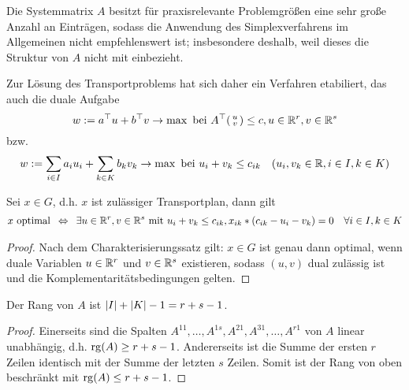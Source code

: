 Die Systemmatrix $A$ besitzt für praxisrelevante Problemgrößen eine sehr große Anzahl an Einträgen, sodass die Anwendung des Simplexverfahrens im Allgemeinen nicht empfehlenswert ist; insbesondere deshalb, weil dieses die Struktur von $A$ nicht mit einbezieht.

Zur Lösung des Transportproblems hat sich daher ein Verfahren etabiliert, das auch die duale Aufgabe 
\begin{equation}
	w \mathrel{:=} a^{\top} u + b^{\top} v \to \max \text{ bei } A^{\top} \begin{psmallmatrix} u \\ v \end{psmallmatrix} \le c, u \in \mathbb{R}^r, v \in \mathbb{R}^s
	\label{eq: 3.16}
\end{equation}
bzw.
\begin{equation}
	w \mathrel{:=} \sum_{i \in I} a_i u_i + \sum_{k \in K} b_k v_k \to \max \text{ bei } u_i + v_k \le c_{ik} \quad (u_i, v_k \in \mathbb{R}, i \in I, k \in K)
	\label{eq: 3.17}
\end{equation}

\begin{satz}[Optimalitätskriterium] %
	\label{satz: 3.14}
	Sei $x \in G$, d.h. $x$ ist zulässiger Transportplan, dann gilt
	\begin{equation*}
		\begin{aligned}
			x \text{ optimal} \enskip \Leftrightarrow \enskip \exists u \in \mathbb{R}^r, v \in \mathbb{R}^s \text{ mit } u_i + v_k \le c_{ik}, x_{ik} * (c_{ik} - u_i - v_k) = 0 \quad \forall i \in I, k \in K
		\end{aligned}
	\end{equation*}
\end{satz}
\begin{proof}
	Nach dem Charakterisierungssatz gilt: $x \in G$ ist genau dann optimal, wenn duale Variablen $u \in \mathbb{R}^r$ und $v \in \mathbb{R}^s$ existieren, sodass $(u,v)$ dual zulässig ist und die Komplementaritätsbedingungen gelten.
\end{proof}

\begin{aussage} %
	Der Rang von $A$ ist $\left| I \right| + \left| K \right| - 1 = r+s-1$.
\end{aussage}
\begin{proof}
	Einerseits sind die Spalten $A^{11}, \dots, A^{1s}, A^{21}, A^{31}, \dots, A^{r1}$ von $A$ linear unabhängig, d.h. $\operatorname{rg}(A) \ge r + s - 1$.
	Andererseits ist die Summe der ersten $r$ Zeilen identisch mit der Summe der letzten $s$ Zeilen. Somit ist der Rang von oben beschränkt mit $\operatorname{rg}(A) \le r + s -1$.
\end{proof}

